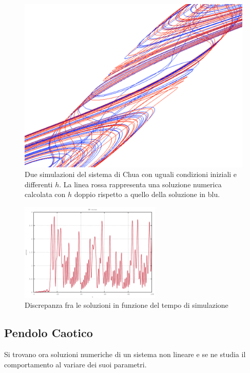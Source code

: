 \begin{figure}[H]
\centering
\includegraphics[width=\textwidth]{rk_error}
\caption{Due simulazioni del sistema di Chua con uguali condizioni iniziali e differenti $h$. La linea rossa rappresenta una soluzione numerica calcolata con $h$ doppio rispetto a quello della soluzione in blu.}
\label{fig:rk_error}
\end{figure}

\begin{figure}[H]
\centering
\includegraphics[width=0.6\textwidth]{ode}
\caption{Discrepanza fra le soluzioni in funzione del tempo di simulazione}
\label{fig:ode}
\end{figure}


\subsection{Pendolo Caotico}
Si trovano ora soluzioni numeriche di un sistema non lineare e se ne studia il comportamento al variare dei suoi parametri.
\\

